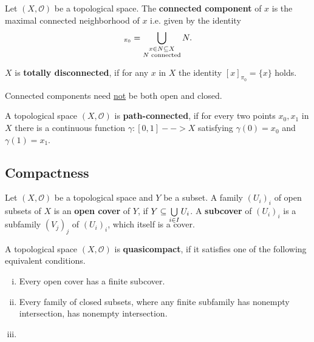 \begin{lemma}
\end{lemma}

\begin{definition}
	Let $(X, \mathcal{O})$ be a topological space. The \textbf{connected component} of $x$ is the maximal connected neighborhood of $x$ i.e. given by the identity
	\begin{equation*}
		[x]_{\pi_0} = \Union \limits_{\substack{x \in N \subseteq X\\N\text{ connected}}} N.
	\end{equation*}

	$X$ is \textbf{totally disconnected}, if for any $x$ in $X$ the identity $[x]_{\pi_0} = \{x\}$ holds.
\end{definition}

\begin{remark}
	Connected components need \underline{not} be both open and closed. 
\end{remark}

\begin{lemma}
\end{lemma}

\begin{definition}
	A topological space $(X, \mathcal{O})$ is \textbf{path-connected}, if for every two points $x_0, x_1$ in $X$ there is a continuous function $\gamma: [0,1] --> X$ satisfying $\gamma(0) = x_0$ and $\gamma(1) = x_1$.
\end{definition}

\subsection{Compactness}

\begin{definition}
	Let $(X,\mathcal{O})$ be a topological space and $Y$ be a subset. A family $(U_i)_i$ of open subsets of $X$ is an \textbf{open cover} of $Y$, if $Y \subseteq \smash{\bigcup \limits_{i \in I} U_i}$. A \textbf{subcover} of $(U_i)_i$ is a subfamily $(V_j)_j$ of $(U_i)_i$, which itself is a cover.
\end{definition}

\begin{definition}
	A topological space $(X,\mathcal{O})$ is \textbf{quasicompact}, if it satisfies one of the following equivalent conditions.
	\begin{enumerate}[(i)]
		\item{
			Every open cover has a finite subcover.
		}
		\item{
			Every family of closed subsets, where any finite subfamily has nonempty intersection, has nonempty intersection.
		}
		\item{
		}
	\end{enumerate}
\end{definition}

